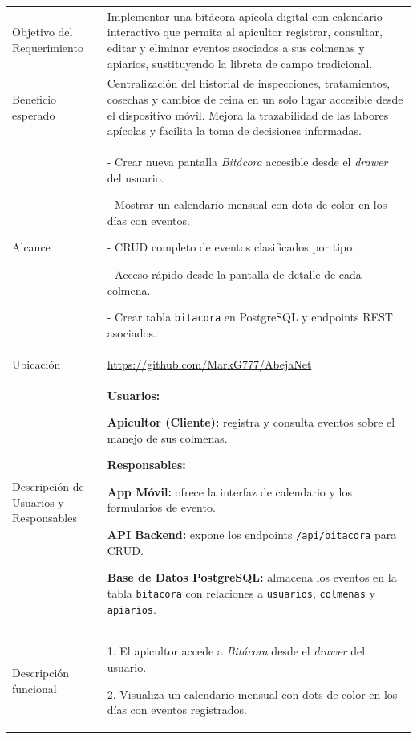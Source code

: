 \noindent
\begin{tabular}{|p{4.5cm}|p{11cm}|}
\hline
\rowcolor{secVerde}\multicolumn{2}{|l|}{\color{white}\textbf{3. DESCRIPCIÓN DEL REQUERIMIENTO}} \\
\hline
Objetivo del Requerimiento &
Implementar una bitácora apícola digital con calendario interactivo que permita al apicultor registrar, consultar, editar y eliminar eventos asociados a sus colmenas y apiarios, sustituyendo la libreta de campo tradicional. \\
\hline
Beneficio esperado &
Centralización del historial de inspecciones, tratamientos, cosechas y cambios de reina en un solo lugar accesible desde el dispositivo móvil. Mejora la trazabilidad de las labores apícolas y facilita la toma de decisiones informadas. \\
\hline
Alcance &
- Crear nueva pantalla \textit{Bitácora} accesible desde el \textit{drawer} del usuario. \par
- Mostrar un calendario mensual con dots de color en los días con eventos. \par
- CRUD completo de eventos clasificados por tipo. \par
- Acceso rápido desde la pantalla de detalle de cada colmena. \par
- Crear tabla \texttt{bitacora} en PostgreSQL y endpoints REST asociados. \\
\hline
Ubicación & \url{https://github.com/MarkG777/AbejaNet} \\ \hline
Descripción de Usuarios y Responsables &
\textbf{Usuarios:} \par
\textbf{Apicultor (Cliente):} registra y consulta eventos sobre el manejo de sus colmenas. \par
\vspace{0.1cm}
\textbf{Responsables:} \par
\textbf{App Móvil:} ofrece la interfaz de calendario y los formularios de evento. \par
\textbf{API Backend:} expone los endpoints \texttt{/api/bitacora} para CRUD. \par
\textbf{Base de Datos PostgreSQL:} almacena los eventos en la tabla \texttt{bitacora} con relaciones a \texttt{usuarios}, \texttt{colmenas} y \texttt{apiarios}. \\
\hline
Descripción funcional &
1. El apicultor accede a \textit{Bitácora} desde el \textit{drawer} del usuario. \par
2. Visualiza un calendario mensual con dots de color en los días con eventos registrados. \par

\end{tabular}

